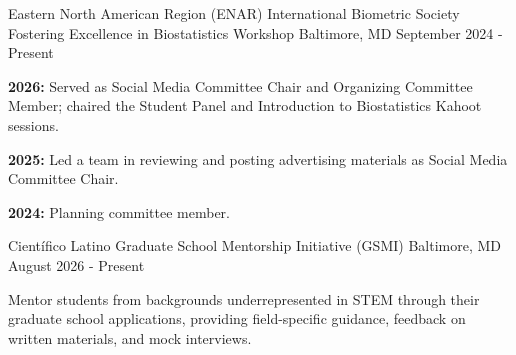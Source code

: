 

\begin{cventries}

\cventry
    {Eastern North American Region (ENAR) International Biometric Society} %
    {Fostering Excellence in Biostatistics Workshop} %
    {Baltimore, MD} %
    {September 2024 - Present} %
    {
      \begin{cvitems} 
        \item \textbf{2026:} Served as Social Media Committee Chair and Organizing Committee Member; 
              chaired the Student Panel \newline and Introduction to Biostatistics Kahoot sessions.
        \item \textbf{2025:} Led a team in reviewing and posting advertising materials as Social Media Committee Chair.
        \item \textbf{2024:} Planning committee member.
      \end{cvitems}
    }

    \cventry
    {Cient\'ifico Latino} %
    {Graduate School Mentorship Initiative (GSMI)} %
    {Baltimore, MD} %
    {August 2026 - Present} %
    {
      \begin{cvitems}
        \item Mentor students from backgrounds underrepresented in STEM through their graduate
              school applications, \newline providing field-specific guidance, feedback on written
              materials, and mock interviews.
      \end{cvitems}
    }
    

\end{cventries}
